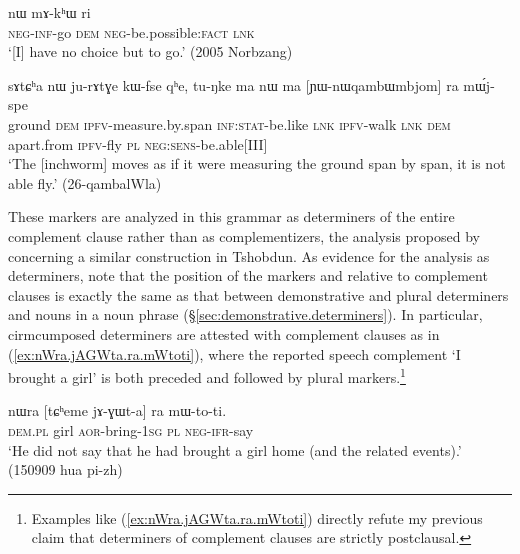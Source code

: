  \begin{exe}
\ex \label{ex:mAkACe.nW.mAkhW}
\gll [mɤ-kɤ-ɕe] nɯ mɤ-kʰɯ ri \\
\textsc{neg}-\textsc{inf}-go \textsc{dem} \textsc{neg}-be.possible:\textsc{fact} \textsc{lnk} \\
\glt `[I] have no choice but to go.' (2005 Norbzang)
\end{exe}

 \begin{exe}
\ex \label{ex:YWnWqambWmbjom.ra.mWjspe}
\gll  sɤtɕʰa nɯ ju-rɤtɣe kɯ-fse qʰe, tu-ŋke ma nɯ ma [ɲɯ-nɯqambɯmbjom] ra mɯ́j-spe \\
ground \textsc{dem} \textsc{ipfv}-measure.by.span \textsc{inf}:\textsc{stat}-be.like \textsc{lnk} \textsc{ipfv}-walk \textsc{lnk} \textsc{dem} apart.from \textsc{ipfv}-fly \textsc{pl} \textsc{neg}:\textsc{sens}-be.able[III] \\
\glt `The [inchworm] moves as if it were measuring the ground span by span, it is not able fly.' (26-qambalWla)
\end{exe}
 
These markers are analyzed in this grammar as determiners of the entire complement clause rather than as complementizers, the analysis proposed by \citet[481]{sun12complementation} concerning a similar construction in Tshobdun. As evidence for the analysis as determiners, note that the position of the markers  and  relative to complement clauses  is exactly the same as that between demonstrative and plural determiners and nouns in a noun phrase (§\ref{sec:demonstrative.determiners}). In particular, cirmcumposed determiners are attested with complement clauses as in (\ref{ex:nWra.jAGWta.ra.mWtoti}), where the reported speech complement  `I brought a girl' is both preceded and followed by plural markers.\footnote{Examples like (\ref{ex:nWra.jAGWta.ra.mWtoti}) directly refute my previous claim \citep[258]{jacques16complementation} that determiners of complement clauses are strictly postclausal. }

\begin{exe}
\ex \label{ex:nWra.jAGWta.ra.mWtoti}
\gll nɯra [tɕʰeme jɤ-ɣɯt-a] ra mɯ-to-ti. \\
\textsc{dem}.\textsc{pl} girl \textsc{aor}-bring-\textsc{1sg} \textsc{pl} \textsc{neg}-\textsc{ifr}-say \\
\glt  `He did not say that he had brought a girl home (and the related events).'  (150909 hua pi-zh)
\end{exe}
 
